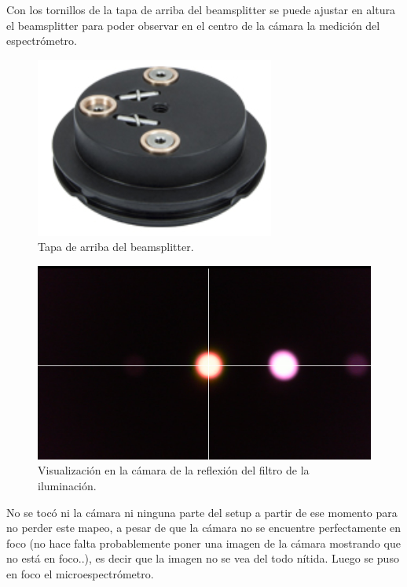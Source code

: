 Con los tornillos de la tapa de arriba del beamsplitter se puede ajustar en altura el beamsplitter para poder observar en el centro de la cámara la medición del espectrómetro.
\begin{figure}[H]
	\centering
	\includegraphics[scale=0.5]{Figs/microespectrometro/b4c.png}
	\caption{Tapa de arriba del beamsplitter.}
	\label{fig:bgcel}
\end{figure}


\begin{figure}[H]
	\centering
	\includegraphics[scale=0.5]{Figs/microespectrometro/mapspectrometrocamera.png}
	\caption{Visualización en la cámara de la reflexión del filtro de la iluminación.}
	\label{fig:bgcel}
\end{figure}


No se tocó ni la cámara ni ninguna parte del setup a partir de ese momento para no perder este mapeo, a pesar de que la cámara no se encuentre perfectamente en foco (no hace falta probablemente poner una imagen de la cámara mostrando que no está en foco..), es decir que la imagen no se vea del todo nítida.
Luego se puso en foco el microespectrómetro.



